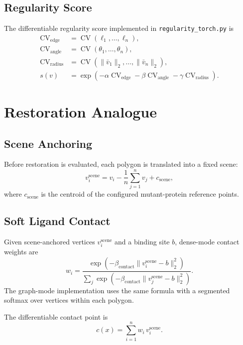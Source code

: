 \documentclass[11pt]{article}
\newcommand{\CV}{\operatorname{CV}}
\begin{document}
\subsection{Regularity Score}
The differentiable regularity score implemented in \texttt{regularity\_torch.py} is
\begin{align}
\CV_{\mathrm{edge}} &= \CV(\ell_1,\dots,\ell_n), \\
\CV_{\mathrm{angle}} &= \CV(\theta_1,\dots,\theta_n), \\
\CV_{\mathrm{radius}} &= \CV(\|\bar{v}_1\|_2,\dots,\|\bar{v}_n\|_2), \\
s(v)
&=
\exp\!\left(
-\alpha \CV_{\mathrm{edge}}
-\beta \CV_{\mathrm{angle}}
-\gamma \CV_{\mathrm{radius}}
\right).
\end{align}

\section{Restoration Analogue}
\subsection{Scene Anchoring}
Before restoration is evaluated, each polygon is translated into a fixed scene:
\begin{equation}
v_i^{\mathrm{scene}}
=
v_i - \frac{1}{n}\sum_{j=1}^n v_j + c_{\mathrm{scene}},
\end{equation}
where $c_{\mathrm{scene}}$ is the centroid of the configured mutant-protein reference points.

\subsection{Soft Ligand Contact}
Given scene-anchored vertices $v_i^{\mathrm{scene}}$ and a binding site $b$, dense-mode contact weights are
\begin{equation}
w_i
=
\frac{\exp\!\left(-\beta_{\mathrm{contact}}\|v_i^{\mathrm{scene}} - b\|_2^2\right)}
{\sum_j \exp\!\left(-\beta_{\mathrm{contact}}\|v_j^{\mathrm{scene}} - b\|_2^2\right)}.
\end{equation}
The graph-mode implementation uses the same formula with a segmented softmax over vertices within each polygon.

The differentiable contact point is
\begin{equation}
c(x) = \sum_{i=1}^n w_i\,v_i^{\mathrm{scene}}.
\end{equation}
\end{document}
